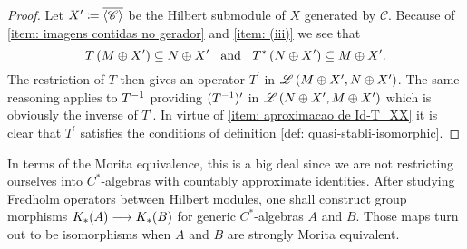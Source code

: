 \begin{lema}
\begin{proof}
Let $X' \coloneqq \overline{\langle{\mathscr C}\rangle}$ be the Hilbert submodule of $X$ generated by $\mathscr C$. Because of \ref{item: imagens contidas no gerador} and \ref{item: (iii)} we see that 
$$T\left(M \oplus X'\right) \subseteq N \oplus X' \hspace{0.25cm}\operatorname{and}\hspace{0.25cm} T^{*}\left(N \oplus X'\right) \subseteq M \oplus X'.$$ 
The restriction of $T$ then gives an operator $T^{\prime}$ in $\mathscr L\left(M \oplus X', N \oplus X'\right)$. The same reasoning applies to ${{T}^{-1}}$ providing $({{T}^{-1}})^{\prime}$ in $\mathscr L\left(N \oplus X', M \oplus X'\right)$ which is obviously the inverse of $T^{\prime}$. In virtue of \ref{item: aproximacao de Id-T_XX} it is clear that $T^{\prime}$ satisfies the conditions of definition \ref{def: quasi-stabli-isomorphic}.
\end{proof}
\end{lema}

In terms of the Morita equivalence, this is a big deal since we are not restricting ourselves into $C^*$-algebras with countably approximate identities. After studying Fredholm operators between Hilbert modules, one shall construct group morphisms $K_*(A) \longrightarrow K_*(B)$ for generic $C^*$-algebras $A$ and $B$. Those maps turn out to be isomorphisms when $A$ and $B$ are strongly Morita equivalent.

